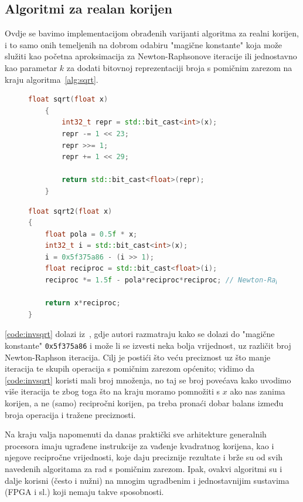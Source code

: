 \documentclass[12pt]{scrartcl}
\begin{document}
\subsection{Algoritmi za realan korijen}
Ovdje se bavimo implementacijom obrađenih varijanti algoritma za realni korijen, i to samo onih temeljenih na dobrom odabiru "magične konstante"
koja može služiti kao početna aproksimacija za Newton-Raphsonove iteracije ili jednostavno kao parametar $k$ za dodati bitovnoj reprezentaciji
broja s pomičnim zarezom na kraju algoritma~\ref{alg:sqrt}.
\begin{figure}[h]
\begin{lstlisting}[language=C++, label=code:sqrt, caption=Direktna aproksimacija realnog korijena u C++20]
    float sqrt(float x)
    {
        int32_t repr = std::bit_cast<int>(x);
        repr -= 1 << 23;
        repr >>= 1;
        repr += 1 << 29;
    
        return std::bit_cast<float>(repr);
    }
\end{lstlisting}
\end{figure}

\begin{figure}[h]
\begin{lstlisting}[language=C++, label=code:invsqrt, caption=Aproksimacija korijena preko recipročne vrijednosti u C++20]
float sqrt2(float x)
{
    float pola = 0.5f * x;
    int32_t i = std::bit_cast<int>(x);
    i = 0x5f375a86 - (i >> 1);
    float reciproc = std::bit_cast<float>(i);
    reciproc *= 1.5f - pola*reciproc*reciproc; // Newton-Raphson iteracija; moguce ponoviti vise puta

    return x*reciproc;
}
\end{lstlisting}
\end{figure}

\autoref{code:invsqrt} dolazi iz~\cite{walczyk2018improving}, gdje autori razmatraju kako se dolazi do "magične konstante"
\verb|0x5f375a86| i može li se izvesti neka bolja vrijednost, uz različit broj Newton-Raphson iteracija. Cilj je postići što
veću preciznost uz što manje iteracija te skupih operacija s pomičnim zarezom općenito; vidimo da \autoref{code:invsqrt} koristi mali
broj množenja, no taj se broj povećava kako uvodimo više iteracija te zbog toga što na kraju moramo pomnožiti s $x$ ako nas zanima korijen, a ne
(samo) recipročni korijen, pa treba pronaći dobar balans između broja operacija i tražene preciznosti.

Na kraju valja napomenuti da danas praktički sve arhitekture generalnih procesora imaju ugrađene instrukcije za vađenje kvadratnog korijena, kao
i njegove recipročne vrijednosti, koje daju preciznije rezultate i brže su od svih navedenih algoritama za rad s pomičnim zarezom. Ipak, ovakvi
algoritmi su i dalje korisni (često i nužni) na mnogim ugradbenim i jednostavnijim sustavima (FPGA i sl.) koji nemaju takve sposobnosti.
\end{document}
